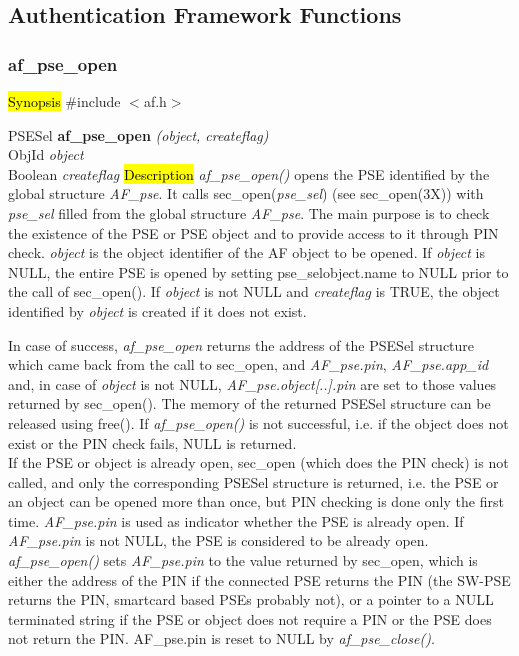 \subsection{Authentication Framework Functions}         

\subsubsection{af\_pse\_open}
\label{af_pse_open}
\hl{Synopsis}
\#include $<$af.h$>$

PSESel {\bf *af\_pse\_open} {\em (object, createflag)} \\
ObjId {\em *object} \\
Boolean {\em createflag}
\hl{Description}
{\em af\_pse\_open()} opens the PSE identified by the global structure {\em AF\_pse}.
It calls sec\_open({\em pse\_sel}) (see sec\_open(3X)) 
with {\em pse\_sel} filled from the global structure {\em AF\_pse}.
The main purpose is to check the existence of the PSE or PSE object and
to provide access to it through PIN check.
{\em object} is the object identifier of the AF object to be opened.
If {\em object} is NULL, the entire PSE is opened by setting pse\_sel\pf object.name
to NULL prior to the call of sec\_open().
If {\em object} is not NULL and {\em createflag} is TRUE, the object identified by {\em object}
is created if it does not exist.
 
In case of success, {\em af\_pse\_open} returns the address of the PSESel structure which came back from
the call to sec\_open, and {\em AF\_pse.pin}, {\em AF\_pse.app\_id} and, in case of
{\em object} is not NULL, {\em AF\_pse.object[..].pin} are set to those values returned
by sec\_open(). The memory of the returned PSESel structure can be released using free().
If {\em af\_pse\_open()} is not successful, i.e. if the object does not exist or the
PIN check fails, NULL is returned.
\\ [1em]
If the PSE or object is already open, sec\_open (which does the PIN check) is not called, 
and only the corresponding PSESel structure is returned, i.e. the PSE or an object
can be opened more than once, but PIN checking is done only the first time. 
{\em AF\_pse.pin} is used as indicator whether the PSE is already open. If {\em AF\_pse.pin} is not NULL,
the PSE is considered to be already open. {\em af\_pse\_open()} sets {\em AF\_pse.pin} to the value returned
by sec\_open, which is either the address of the PIN if the connected PSE returns the PIN (the
SW-PSE returns the PIN, smartcard based PSEs probably not), or a pointer to a NULL terminated
string if the PSE or object does not require a PIN or the PSE does not return the PIN.
AF\_pse.pin is reset to NULL by {\em af\_pse\_close()}.
 
